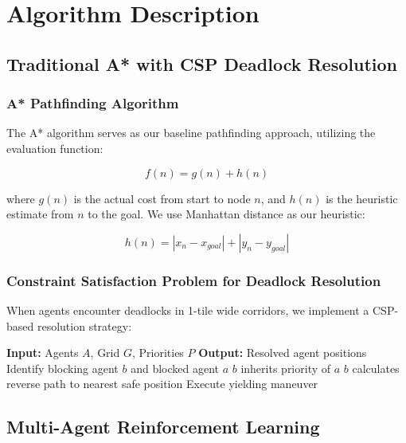 \documentclass[12pt, a4paper]{report}
\begin{document}
\chapter{Algorithm Description}

\section{Traditional A* with CSP Deadlock Resolution}

\subsection{A* Pathfinding Algorithm}
The A* algorithm serves as our baseline pathfinding approach, utilizing the evaluation function:

\begin{equation}
f(n) = g(n) + h(n)
\end{equation}

where $g(n)$ is the actual cost from start to node $n$, and $h(n)$ is the heuristic estimate from $n$ to the goal. We use Manhattan distance as our heuristic:

\begin{equation}
h(n) = |x_n - x_{goal}| + |y_n - y_{goal}|
\end{equation}

\subsection{Constraint Satisfaction Problem for Deadlock Resolution}
When agents encounter deadlocks in 1-tile wide corridors, we implement a CSP-based resolution strategy:

\begin{algorithm}[H]
\caption{Priority-Based Deadlock Resolution}
\begin{algorithmic}[1]
\STATE \textbf{Input:} Agents $A$, Grid $G$, Priorities $P$
\STATE \textbf{Output:} Resolved agent positions
    \STATE Identify blocking agent $b$ and blocked agent $a$
        \STATE $b$ inherits priority of $a$
        \STATE $b$ calculates reverse path to nearest safe position
        \STATE Execute yielding maneuver
    \ENDIF
\ENDFOR
\end{algorithmic}
\end{algorithm}

\section{Multi-Agent Reinforcement Learning}
\end{document}
